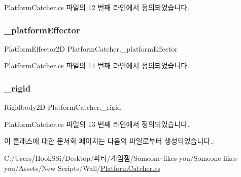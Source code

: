 Platform\+Catcher.\+cs 파일의 12 번째 라인에서 정의되었습니다.

\mbox{\label{class_platform_catcher_a9a76fa21f5f0843c1115e36e50eb33f6}} 
\subsubsection{\texorpdfstring{\_platformEffector}{\_platformEffector}}
{\footnotesize\ttfamily Platform\+Effector2D Platform\+Catcher.\+\_\+platform\+Effector\hspace{0.3cm}{\ttfamily [private]}}



Platform\+Catcher.\+cs 파일의 14 번째 라인에서 정의되었습니다.

\mbox{\label{class_platform_catcher_ae8627f8ac9558d21ee7b73eb5bb7d202}} 
\subsubsection{\texorpdfstring{\_rigid}{\_rigid}}
{\footnotesize\ttfamily Rigidbody2D Platform\+Catcher.\+\_\+rigid\hspace{0.3cm}{\ttfamily [private]}}



Platform\+Catcher.\+cs 파일의 13 번째 라인에서 정의되었습니다.



이 클래스에 대한 문서화 페이지는 다음의 파일로부터 생성되었습니다.\+:\begin{DoxyCompactItemize}
\item 
C\+:/\+Users/\+Hook\+S\+Si/\+Desktop/파티/게임잼/\+Someone-\/likes-\/you/\+Someone likes you/\+Assets/\+New Scripts/\+Wall/\mbox{\hyperlink{_platform_catcher_8cs}{Platform\+Catcher.\+cs}}\end{DoxyCompactItemize}
